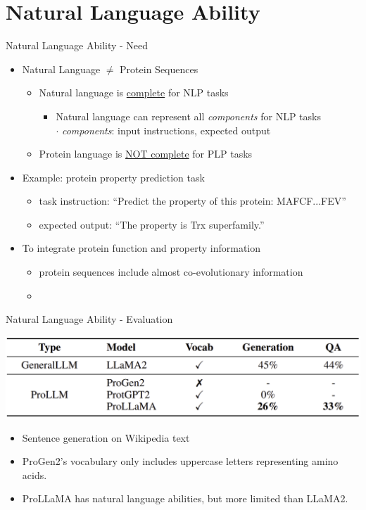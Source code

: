 \section{Natural Language Ability}
\begin{frame}{Natural Language Ability - Need}
	\begin{itemize}\setlength\itemsep{3em}
		\item Natural Language $\neq$ Protein Sequences
		\begin{itemize}\setlength\itemsep{1em}
			\item Natural language is \underline{complete} for NLP tasks
			\begin{itemize}
				\item Natural language can represent all \emph{components} for NLP tasks
				\\$\cdot$ \emph{components}: input instructions, expected output
			\end{itemize}
			\item Protein language is \underline{NOT complete} for PLP tasks
		\end{itemize}
		\item Example: protein property prediction task
		\begin{itemize}
			\item task instruction: ``Predict the property of this protein: MAFCF...FEV''
			\item expected output: ``The property is Trx superfamily.''
		\end{itemize}
		\item To integrate protein function and property information
		\begin{itemize}
			\item protein sequences include almost co-evolutionary information
			\item \cite{xu2023protst,wang2023instructprotein}
		\end{itemize}
	\end{itemize}
\end{frame}

\begin{frame}{Natural Language Ability - Evaluation}
	\begin{center}
		\includegraphics[scale=0.21]{tables/natural_language_ability_comparison.png}
	\end{center}
	\begin{itemize}
		\item Sentence generation on Wikipedia text
		\item ProGen2's vocabulary only includes uppercase letters representing amino acids.
		\item ProLLaMA has natural language abilities, but more limited than LLaMA2.
	\end{itemize}
\end{frame}